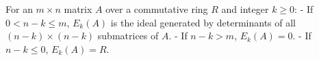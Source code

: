 For an $m \times n$ matrix $A$ over a commutative ring $R$ and integer $k \geq 0$:
- If $0 < n-k \leq m$, $E_k(A)$ is the ideal generated by determinants of all $(n-k) \times (n-k)$ submatrices of $A$.
- If $n-k > m$, $E_k(A) = 0$.
- If $n-k \leq 0$, $E_k(A) = R$.
